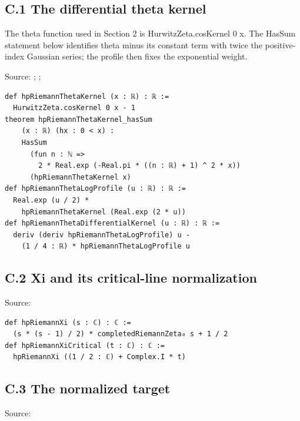 \documentclass[
  11pt,
]{article}
\begin{document}
\hypertarget{c.1-the-differential-theta-kernel}{%
\subsection{C.1 The differential theta kernel}\label{c.1-the-differential-theta-kernel}}

The theta function used in Section 2 is HurwitzZeta.cosKernel 0 x. The HasSum statement below identifies theta minus its constant term with twice the positive-index Gaussian series; the profile then fixes the exponential weight.

Source: ; ; 

\begin{verbatim}
def hpRiemannThetaKernel (x : ℝ) : ℝ :=
  HurwitzZeta.cosKernel 0 x - 1
theorem hpRiemannThetaKernel_hasSum
    (x : ℝ) (hx : 0 < x) :
    HasSum
      (fun n : ℕ =>
        2 * Real.exp (-Real.pi * ((n : ℝ) + 1) ^ 2 * x))
      (hpRiemannThetaKernel x)
def hpRiemannThetaLogProfile (u : ℝ) : ℝ :=
  Real.exp (u / 2) *
    hpRiemannThetaKernel (Real.exp (2 * u))
def hpRiemannThetaDifferentialKernel (u : ℝ) : ℝ :=
  deriv (deriv hpRiemannThetaLogProfile) u -
    (1 / 4 : ℝ) * hpRiemannThetaLogProfile u
\end{verbatim}

\hypertarget{c.2-xi-and-its-critical-line-normalization}{%
\subsection{C.2 Xi and its critical-line normalization}\label{c.2-xi-and-its-critical-line-normalization}}

Source: 

\begin{verbatim}
def hpRiemannXi (s : ℂ) : ℂ :=
  (s * (s - 1) / 2) * completedRiemannZeta₀ s + 1 / 2
def hpRiemannXiCritical (t : ℂ) : ℂ :=
  hpRiemannXi ((1 / 2 : ℂ) + Complex.I * t)
\end{verbatim}

\hypertarget{c.3-the-normalized-target}{%
\subsection{C.3 The normalized target}\label{c.3-the-normalized-target}}

Source: 
\end{document}
